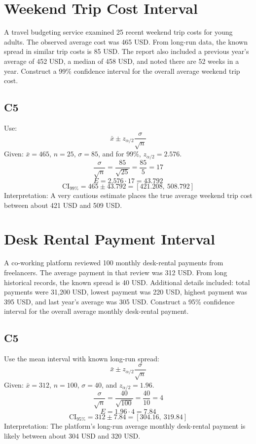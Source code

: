 \begin{ExamProblems}
		\newpage
		\item
		\section{Weekend Trip Cost Interval}
		A travel budgeting service examined 25 recent weekend trip costs for young adults.
		The observed average cost was 465 USD.
		From long-run data, the known spread in similar trip costs is 85 USD.
		The report also included a previous year's average of 452 USD, a median of 458 USD, and noted there are 52 weeks in a year.
		Construct a 99\% confidence interval for the overall average weekend trip cost.

		\subsection*{C5}
		Use:
		\[
		\bar{x} \pm z_{\alpha/2}\frac{\sigma}{\sqrt{n}}
		\]
		Given: $\bar{x}=465$, $n=25$, $\sigma=85$, and for 99\%, $z_{\alpha/2}=2.576$.
		\[
		\frac{\sigma}{\sqrt{n}}=\frac{85}{\sqrt{25}}=\frac{85}{5}=17
		\]
		\[
		E=2.576\cdot 17=43.792
		\]
		\[
		\text{CI}_{99\%}=465\pm 43.792=[421.208,\ 508.792]
		\]
		Interpretation: A very cautious estimate places the true average weekend trip cost between about 421 USD and 509 USD.

		\newpage
		\item
		\section{Desk Rental Payment Interval}
		A co-working platform reviewed 100 monthly desk-rental payments from freelancers.
		The average payment in that review was 312 USD.
		From long historical records, the known spread is 40 USD.
		Additional details included: total payments were 31{,}200 USD, lowest payment was 220 USD, highest payment was 395 USD, and last year's average was 305 USD.
		Construct a 95\% confidence interval for the overall average monthly desk-rental payment.

		\subsection*{C5}
		Use the mean interval with known long-run spread:
		\[
		\bar{x} \pm z_{\alpha/2}\frac{\sigma}{\sqrt{n}}
		\]
		Given: $\bar{x}=312$, $n=100$, $\sigma=40$, and $z_{\alpha/2}=1.96$.
		\[
		\frac{\sigma}{\sqrt{n}}=\frac{40}{\sqrt{100}}=\frac{40}{10}=4
		\]
		\[
		E=1.96\cdot 4=7.84
		\]
		\[
		\text{CI}_{95\%}=312\pm 7.84=[304.16,\ 319.84]
		\]
		Interpretation: The platform's long-run average monthly desk-rental payment is likely between about 304 USD and 320 USD.

	\end{ExamProblems}

